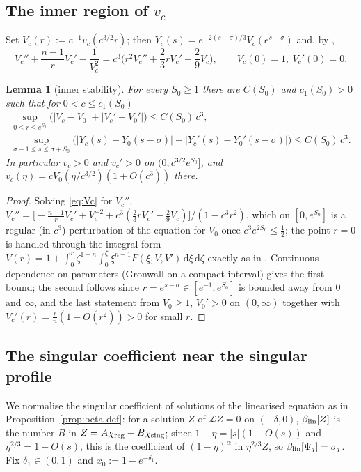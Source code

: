 \documentclass[11pt,a4paper]{amsart}
\newtheorem{lemma}[theorem]{Lemma}
\theoremstyle{definition}
\theoremstyle{remark}
\newcommand{\dd}{\,\mathrm{d}}
\begin{document}
\subsection{The inner region of $v_c$}
Set $V_c(r):=c^{-1}v_c(c^{3/2}r)$; then $Y_c(s)=e^{-2(s-\sigma)/3}V_c(e^{s-\sigma})$ and, by \cite[(2.9)]{GHL22},
\begin{equation}\label{eq:Vc}
V_c''+\frac{n-1}rV_c'-\frac1{V_c^2}=c^3\Big(r^2V_c''+\frac23rV_c'-\frac29V_c\Big),\qquad V_c(0)=1,\ V_c'(0)=0 .
\end{equation}
\begin{lemma}[inner stability]\label{lem:inner-stab}
For every $S_0\ge1$ there are $C(S_0)$ and $c_1(S_0)>0$ such that for $0<c\le c_1(S_0)$
\begin{gather*}
\sup_{0\le r\le e^{S_0}}\big(|V_c-V_0|+|V_c'-V_0'|\big)\le C(S_0)\,c^3,\\
\sup_{\sigma-1\le s\le\sigma+S_0}\big(|Y_c(s)-Y_0(s-\sigma)|+|Y_c'(s)-Y_0'(s-\sigma)|\big)\le C(S_0)\,c^3 .
\end{gather*}
In particular $v_c>0$ and $v_c'>0$ on $(0,c^{3/2}e^{S_0}]$, and $v_c(\eta)=cV_0(\eta/c^{3/2})(1+O(c^3))$ there.
\end{lemma}
\begin{proof}
Solving \eqref{eq:Vc} for $V_c''$, $V_c''=\big[-\frac{n-1}rV_c'+V_c^{-2}+c^3(\frac23rV_c'-\frac29V_c)\big]/(1-c^3r^2)$, which on $[0,e^{S_0}]$ is a regular (in $c^3$) perturbation of the equation for $V_0$ once $c^3e^{2S_0}\le\frac12$; the point $r=0$ is handled through the integral form $V(r)=1+\int_0^r\zeta^{1-n}\int_0^\zeta\xi^{n-1}F(\xi,V,V')\dd\xi\dd\zeta$ exactly as in \cite[Lemma A.3]{GHL22}.  Continuous dependence on parameters (Gronwall on a compact interval) gives the first bound; the second follows since $r=e^{s-\sigma}\in[e^{-1},e^{S_0}]$ is bounded away from $0$ and $\infty$, and the last statement from $V_0\ge1$, $V_0'>0$ on $(0,\infty)$ together with $V_c'(r)=\frac{r}{n}(1+O(r^2))>0$ for small $r$.
\end{proof}

\subsection{The singular coefficient near the singular profile}
We normalise the singular coefficient of solutions of the linearised equation as in Proposition~\ref{prop:beta-def}: for a solution $Z$ of $\mathcal LZ=0$ on $(-\delta,0)$, $\beta_{\rm lin}[Z]$ is the number $B$ in $Z=A\chi_{\rm reg}+B\chi_{\rm sing}$; since $1-\eta=|s|(1+O(s))$ and $\eta^{2/3}=1+O(s)$, this is the coefficient of $(1-\eta)^\alpha$ in $\eta^{2/3}Z$, so $\beta_{\rm lin}[\Psi_j]=\sigma_j$.  Fix $\delta_1\in(0,1)$ and $x_0:=1-e^{-\delta_1}$.
\end{document}
